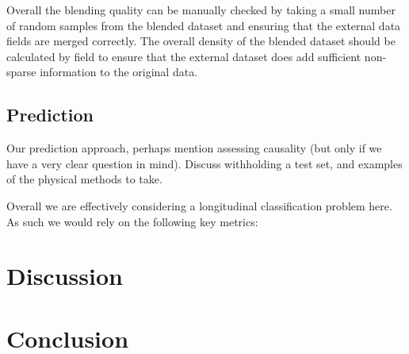 \documentclass{article}
\begin{document}
\noindent Overall the blending quality can be manually checked by taking 
a small number of random samples from the blended dataset and ensuring that the 
external data fields are merged correctly. The overall density of the blended 
dataset should be calculated by field to ensure that the external dataset does 
add sufficient non-sparse information to the original data.

\subsection{Prediction}

Our prediction approach, perhaps mention assessing causality (but only if we 
have a very clear question in mind). Discuss withholding a test set, and 
examples of the physical methods to take.

\noindent Overall we are effectively considering a longitudinal classification
problem here. As such we would rely on the following key metrics:

\section{Discussion}

\section{Conclusion}
\end{document}
